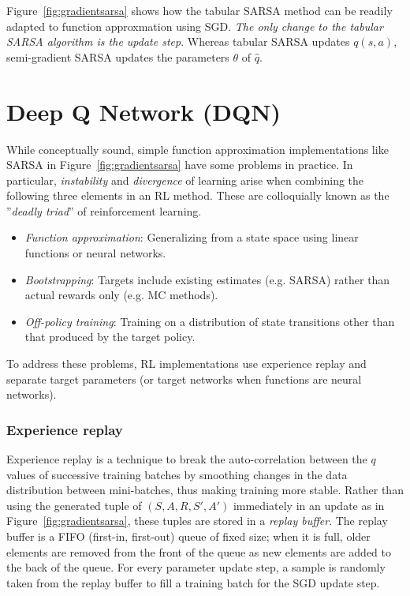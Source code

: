 Figure~\ref{fig:gradientsarsa} shows how the tabular SARSA method can be readily adapted to function approxmation using SGD. \emph{The only change to the tabular SARSA algorithm is the update step}. Whereas tabular SARSA updates $q(s, a)$, semi-gradient SARSA updates the parameters $\theta$ of $\hat{q}$. 

\section{Deep Q Network (DQN)}

While conceptually sound, simple function approximation implementations like SARSA in Figure~\ref{fig:gradientsarsa} have some problems in practice. In particular, \emph{instability} and \emph{divergence} of learning arise when combining the following three elements in an RL method. These are colloquially known as the ''\emph{deadly triad}'' of reinforcement learning.

\begin{itemize}
\item \emph{Function approximation}: Generalizing from a state space using linear functions or neural networks.
\item \emph{Bootstrapping}: Targets include existing estimates (e.g. SARSA) rather than actual rewards only (e.g. MC methods).
\item \emph{Off-policy training}: Training on a distribution of state transitions other than that produced by the target policy.
\end{itemize}

To address these problems, RL implementations use experience replay and separate target parameters (or target networks when functions are neural networks). 

\subsubsection*{Experience replay} 

Experience replay is a technique to break the auto-correlation between the $q$ values of successive training batches by smoothing changes in the data distribution between mini-batches, thus making training more stable. Rather than using the generated tuple of $(S, A, R, S', A')$ immediately in an update as in Figure~\ref{fig:gradientsarsa}, these tuples are stored in a \emph{replay buffer}. The replay buffer is a FIFO (first-in, first-out) queue of fixed size; when it is full, older elements are removed from the front of the queue as new elements are added to the back of the queue. For every parameter update step, a sample is randomly taken from the replay buffer to fill a training batch for the SGD update step. 

